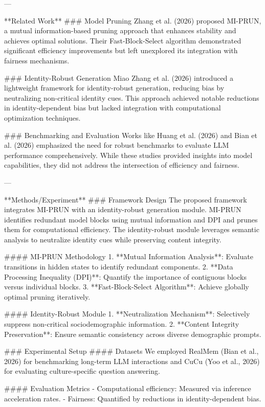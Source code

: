 ---

**Related Work**  
### Model Pruning  
Zhang et al. (2026) proposed MI-PRUN, a mutual information-based pruning approach that enhances stability and achieves optimal solutions. Their Fast-Block-Select algorithm demonstrated significant efficiency improvements but left unexplored its integration with fairness mechanisms.  

### Identity-Robust Generation  
Miao Zhang et al. (2026) introduced a lightweight framework for identity-robust generation, reducing bias by neutralizing non-critical identity cues. This approach achieved notable reductions in identity-dependent bias but lacked integration with computational optimization techniques.  

### Benchmarking and Evaluation  
Works like Huang et al. (2026) and Bian et al. (2026) emphasized the need for robust benchmarks to evaluate LLM performance comprehensively. While these studies provided insights into model capabilities, they did not address the intersection of efficiency and fairness.

---

**Methods/Experiment**  
### Framework Design  
The proposed framework integrates MI-PRUN with an identity-robust generation module. MI-PRUN identifies redundant model blocks using mutual information and DPI and prunes them for computational efficiency. The identity-robust module leverages semantic analysis to neutralize identity cues while preserving content integrity.

#### MI-PRUN Methodology  
1. **Mutual Information Analysis**: Evaluate transitions in hidden states to identify redundant components.  
2. **Data Processing Inequality (DPI)**: Quantify the importance of contiguous blocks versus individual blocks.  
3. **Fast-Block-Select Algorithm**: Achieve globally optimal pruning iteratively.  

#### Identity-Robust Module  
1. **Neutralization Mechanism**: Selectively suppress non-critical sociodemographic information.  
2. **Content Integrity Preservation**: Ensure semantic consistency across diverse demographic prompts.

### Experimental Setup  
#### Datasets  
We employed RealMem (Bian et al., 2026) for benchmarking long-term LLM interactions and CuCu (Yoo et al., 2026) for evaluating culture-specific question answering.  

#### Evaluation Metrics  
- Computational efficiency: Measured via inference acceleration rates.  
- Fairness: Quantified by reductions in identity-dependent bias.  

